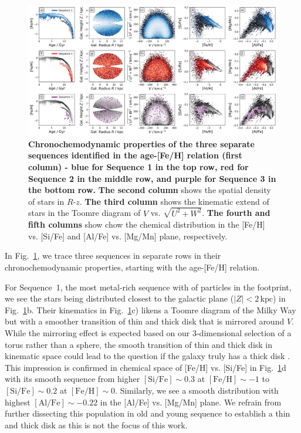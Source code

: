 \documentclass[fleqn,usenatbib]{mnras}
\begin{document}
\begin{figure}
	\includegraphics[width=\textwidth]{figures/three_sequences_traced.png}
    \caption{
    \textbf{Chronochemodynamic properties of the three separate sequences identified in the age-[Fe/H] relation (first column) - blue for Sequence 1 in the top row, red for Sequence 2 in the middle row, and purple for Sequence 3 in the bottom row.
    }
    \textbf{The second column} shows the spatial density of stars in $R$-$z$.
    \textbf{The third column} shows the kinematic extend of stars in the Toomre diagram of $V$ vs. $\sqrt{U^2+W^2}$.
    \textbf{The fourth and fifth columns} show chow the chemical distribution in the [Fe/H] vs. [Si/Fe] and [Al/Fe] vs. [Mg/Mn] plane, respectively.
    }
    \label{fig:three_sequences_traced}
\end{figure}

In Fig.~\ref{fig:three_sequences_traced}, we trace three sequences in separate rows in their chronochemodynamic properties, starting with the age-[Fe/H] relation.

For Sequence~1, the most metal-rich sequence with  of particles in the footprint, we see the stars being distributed closest to the galactic plane ($\vert Z \vert < 2\,\mathrm{kpc}$) in Fig.~\ref{fig:three_sequences_traced}b. Their kinematics in Fig.~\ref{fig:three_sequences_traced}c) likens a Toomre diagram of the Milky Way  \citep[][see their Fig.~1a]{Helmi2018} but with a smoother transition of thin and thick disk that is mirrored around $V$. While the mirroring effect is expected based on our 3-dimensional selection of a torus rather than a sphere, the smooth transition of thin and thick disk in kinematic space could lead to the question if the galaxy truly has a thick disk \citep{Bovy2012b}. This impression is confirmed in chemical space of [Fe/H] vs. [Si/Fe] in Fig.~\ref{fig:three_sequences_traced}d with its smooth sequence from higher $\mathrm{[Si/Fe]} \sim 0.3$ at $\mathrm{[Fe/H] \sim -1}$ to $\mathrm{[Si/Fe]} \sim 0.2$ at $\mathrm{[Fe/H] \sim 0}$. Similarly, we see a smooth distribution with highest $\mathrm{[Al/Fe]} \sim -0.22$ in the [Al/Fe] vs. [Mg/Mn] plane. We refrain from further dissecting this population in old and young sequence to establish a thin and thick disk as this is not the focus of this work.
\end{document}
